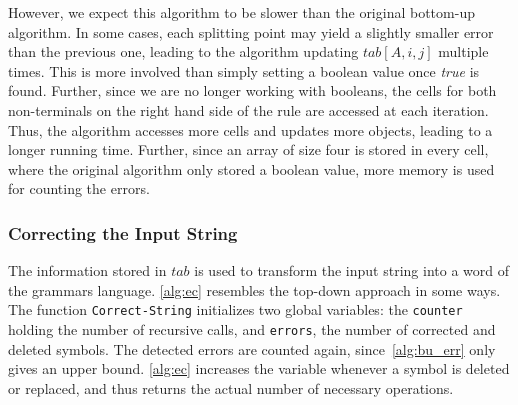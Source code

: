 However, we expect this algorithm to be slower than the original bottom-up algorithm.
In some cases, each splitting point may yield a slightly smaller error than the previous one, leading to the algorithm updating $tab[A,i,j]$ multiple times.
This is more involved than simply setting a boolean value once \textit{true} is found.
Further, since we are no longer working with booleans, the cells for both non-terminals on the right hand side of the rule are accessed at each iteration.
Thus, the algorithm accesses more cells and updates more objects, leading to a longer running time.
Further, since an array of size four is stored in every cell, where the original algorithm only stored a boolean value, more memory is used for counting the errors.

\subsubsection{Correcting the Input String}
\label{subsec:correcting}
The information stored in $tab$ is used to transform the input string into a word of the grammars language.
\cref{alg:ec} resembles the top-down approach in some ways.
The function \texttt{Correct-String} initializes two global variables: the \texttt{counter} holding the number of recursive calls, and \texttt{errors}, the number of corrected and deleted symbols.
The detected errors are counted again, since~\cref{alg:bu_err} only gives an upper bound.
\cref{alg:ec} increases the variable whenever a symbol is deleted or replaced, and thus returns the actual number of necessary operations.

